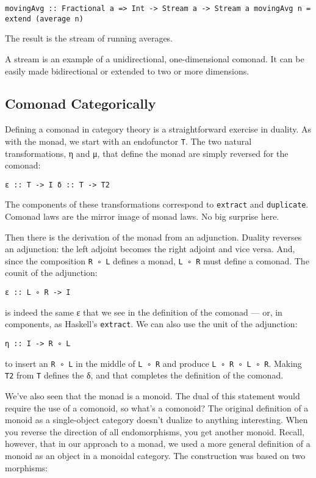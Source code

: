 \begin{verbatim}
movingAvg :: Fractional a => Int -> Stream a -> Stream a movingAvg n = extend (average n)
\end{verbatim}

The result is the stream of running averages.

A stream is an example of a unidirectional, one-dimensional comonad. It
can be easily made bidirectional or extended to two or more dimensions.

\subsection{Comonad Categorically}\label{comonad-categorically}

Defining a comonad in category theory is a straightforward exercise in
duality. As with the monad, we start with an endofunctor \texttt{T}. The
two natural transformations, η and μ, that define the monad are simply
reversed for the comonad:

\begin{verbatim}
ε :: T -> I δ :: T -> T2
\end{verbatim}

The components of these transformations correspond to \texttt{extract}
and \texttt{duplicate}. Comonad laws are the mirror image of monad laws.
No big surprise here.

Then there is the derivation of the monad from an adjunction. Duality
reverses an adjunction: the left adjoint becomes the right adjoint and
vice versa. And, since the composition \texttt{R\ ∘\ L} defines a monad,
\texttt{L\ ∘\ R} must define a comonad. The counit of the adjunction:

\begin{verbatim}
ε :: L ∘ R -> I
\end{verbatim}

is indeed the same ε that we see in the definition of the comonad ---
or, in components, as Haskell's \texttt{extract}. We can also use the
unit of the adjunction:

\begin{verbatim}
η :: I -> R ∘ L
\end{verbatim}

to insert an \texttt{R\ ∘\ L} in the middle of \texttt{L\ ∘\ R} and
produce \texttt{L\ ∘\ R\ ∘\ L\ ∘\ R}. Making \texttt{T2} from \texttt{T}
defines the δ, and that completes the definition of the comonad.

We've also seen that the monad is a monoid. The dual of this statement
would require the use of a comonoid, so what's a comonoid? The original
definition of a monoid as a single-object category doesn't dualize to
anything interesting. When you reverse the direction of all
endomorphisms, you get another monoid. Recall, however, that in our
approach to a monad, we used a more general definition of a monoid as an
object in a monoidal category. The construction was based on two
morphisms:


